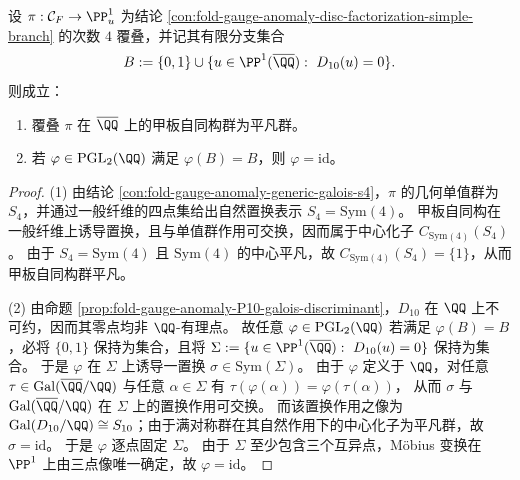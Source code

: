 \begin{corollary}\label{cor:fold-gauge-anomaly-deck-trivial-mobius-rigidity}
设 \(\pi:\mathcal C_F\to\PP^1_u\) 为结论 \ref{con:fold-gauge-anomaly-disc-factorization-simple-branch} 的次数 \(4\) 覆叠，并记其有限分支集合
\[
B:=\{0,1\}\cup\{u\in\PP^1(\overline{\QQ}):\ D_{10}(u)=0\}.
\]
则成立：
\begin{enumerate}
  \item 覆叠 \(\pi\) 在 \(\overline{\QQ}\) 上的甲板自同构群为平凡群。
  \item 若 \(\varphi\in\mathrm{PGL}_2(\QQ)\) 满足 \(\varphi(B)=B\)，则 \(\varphi=\mathrm{id}\)。
\end{enumerate}
\end{corollary}
\begin{proof}
(1) 由结论 \ref{con:fold-gauge-anomaly-generic-galois-s4}，\(\pi\) 的几何单值群为 \(S_4\)，并通过一般纤维的四点集给出自然置换表示 \(S_4=\mathrm{Sym}(4)\)。
甲板自同构在一般纤维上诱导置换，且与单值群作用可交换，因而属于中心化子 \(C_{\mathrm{Sym}(4)}(S_4)\)。
由于 \(S_4=\mathrm{Sym}(4)\) 且 \(\mathrm{Sym}(4)\) 的中心平凡，故 \(C_{\mathrm{Sym}(4)}(S_4)=\{1\}\)，从而甲板自同构群平凡。
\par
(2) 由命题 \ref{prop:fold-gauge-anomaly-P10-galois-discriminant}，\(D_{10}\) 在 \(\QQ\) 上不可约，因而其零点均非 \(\QQ\)-有理点。
故任意 \(\varphi\in\mathrm{PGL}_2(\QQ)\) 若满足 \(\varphi(B)=B\)，必将 \(\{0,1\}\) 保持为集合，且将
\(
\Sigma:=\{u\in\PP^1(\overline{\QQ}):\ D_{10}(u)=0\}
\)
保持为集合。
于是 \(\varphi\) 在 \(\Sigma\) 上诱导一置换 \(\sigma\in\mathrm{Sym}(\Sigma)\)。
由于 \(\varphi\) 定义于 \(\QQ\)，对任意 \(\tau\in\mathrm{Gal}(\overline{\QQ}/\QQ)\) 与任意 \(\alpha\in\Sigma\) 有
\(
\tau(\varphi(\alpha))=\varphi(\tau(\alpha))
\)，
从而 \(\sigma\) 与 \(\mathrm{Gal}(\overline{\QQ}/\QQ)\) 在 \(\Sigma\) 上的置换作用可交换。
而该置换作用之像为 \(\mathrm{Gal}(D_{10}/\QQ)\cong S_{10}\)；由于满对称群在其自然作用下的中心化子为平凡群，故 \(\sigma=\mathrm{id}\)。
于是 \(\varphi\) 逐点固定 \(\Sigma\)。
由于 \(\Sigma\) 至少包含三个互异点，M\"obius 变换在 \(\PP^1\) 上由三点像唯一确定，故 \(\varphi=\mathrm{id}\)。\qedhere
\end{proof}

